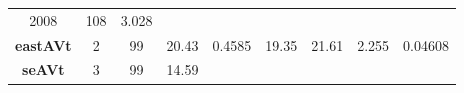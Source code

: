 \documentclass[]{article}
\theoremstyle{definition}
\theoremstyle{definition}
\theoremstyle{definition}
\theoremstyle{remark}
\begin{document}
\begin{longtable}[]{@{}ccccccccc@{}}
\begin{minipage}[t]{0.07\columnwidth}
2008\strut
\end{minipage} & \begin{minipage}[t]{0.07\columnwidth}\centering\strut
108\strut
\end{minipage} & \begin{minipage}[t]{0.08\columnwidth}\centering\strut
3.028\strut
\end{minipage}\tabularnewline
\begin{minipage}[t]{0.14\columnwidth}\centering\strut
\textbf{eastAVt}\strut
\end{minipage} & \begin{minipage}[t]{0.06\columnwidth}\centering\strut
2\strut
\end{minipage} & \begin{minipage}[t]{0.05\columnwidth}\centering\strut
99\strut
\end{minipage} & \begin{minipage}[t]{0.11\columnwidth}\centering\strut
20.43\strut
\end{minipage} & \begin{minipage}[t]{0.08\columnwidth}\centering\strut
0.4585\strut
\end{minipage} & \begin{minipage}[t]{0.08\columnwidth}\centering\strut
19.35\strut
\end{minipage} & \begin{minipage}[t]{0.07\columnwidth}\centering\strut
21.61\strut
\end{minipage} & \begin{minipage}[t]{0.07\columnwidth}\centering\strut
2.255\strut
\end{minipage} & \begin{minipage}[t]{0.08\columnwidth}\centering\strut
0.04608\strut
\end{minipage}\tabularnewline
\begin{minipage}[t]{0.14\columnwidth}\centering\strut
\textbf{seAVt}\strut
\end{minipage} & \begin{minipage}[t]{0.06\columnwidth}\centering\strut
3\strut
\end{minipage} & \begin{minipage}[t]{0.05\columnwidth}\centering\strut
99\strut
\end{minipage} & \begin{minipage}[t]{0.11\columnwidth}\centering\strut
14.59\strut
\end{minipage} & \begin{minipage}[t]{0.08\columnwidth}\centering\strut

\end{minipage}
\end{longtable}
\end{document}
